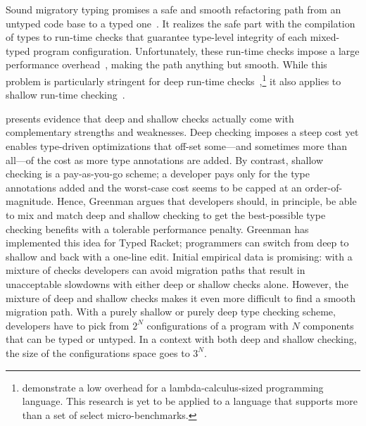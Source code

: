 
Sound migratory typing promises a safe and smooth refactoring path from an
untyped code base to a typed one~\cite{tf-dls-2006, tfffgksst-snapl-2017}. It
realizes the safe part with the compilation of types to run-time checks that
guarantee type-level integrity of each mixed-typed program configuration.
Unfortunately, these run-time checks impose a large performance
overhead~\cite{gtnffvf-jfp-2019}, making the path anything but smooth. While
this problem is particularly stringent for deep run-time
checks~\cite{tf-dls-2006, st-sfp-2006},\footnote{\citet{kas-pldi-2019}
demonstrate a low overhead for a lambda-calculus-sized programming
language. This research is yet to be applied to a language that supports more
than a set of select micro-benchmarks.}  it also applies to shallow run-time
checking~\cite{gm-pepm-2018}.

\citet{g-thesis-2020,g-deep-shallow} presents evidence that deep and shallow
checks actually come with complementary strengths and weaknesses. Deep checking
imposes a steep cost yet enables type-driven optimizations that off-set
some---and sometimes more than all---of the cost as more type annotations are
added. By contrast, shallow checking is a pay-as-you-go scheme; a developer pays
only for the type annotations added and the worst-case cost seems to be capped
at an order-of-magnitude. Hence, Greenman argues that developers should, in
principle, be able to mix and match deep and shallow checking to get the
best-possible type checking benefits with a tolerable performance penalty.
Greenman has implemented this idea for Typed Racket; programmers can
switch from deep to shallow and back with a one-line edit.  Initial empirical data
is promising: with a mixture of checks developers can avoid migration paths that
result in unacceptable slowdowns with either deep or shallow checks alone.
However, the mixture of deep and shallow checks makes it even more difficult to
find a smooth migration path. With a purely shallow or purely deep type checking
scheme, developers have to pick from $2^N$ configurations of a program with $N$
components that can be typed or untyped. In a context with both deep and shallow
checking, the size of the configurations space goes to $3^N$.

